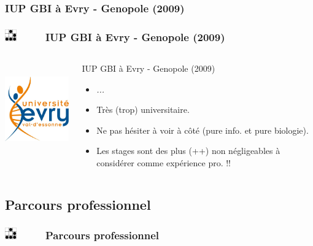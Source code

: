 \documentclass[slidetop,11pt]{beamer}
\def\sectionPartIIaTR{IUP GBI {\`a} Evry - Genopole (2009)} %
\def\sectionPartIIb{Parcours professionnel}
\def\moreInFrameTitle{\includegraphics[height=0.5cm]{img/logo_glider.png}~~~~~}
\begin{document}
\subsubsection{\sectionPartIIaTR}
\begin{frame}
	\frametitle{\moreInFrameTitle \sectionPartIIaTR}
	\begin{columns}[T]
	\begin{column}[T]{5cm}
		\includegraphics[height=4cm]{img/logo_ueve_2010.png}
	\end{column}
	\begin{column}[T]{7cm}
		\begin{beamerboxesrounded}	[lower=substructureTR, %
		 				 upper=block title TR,%
						 shadow=true]%
		       {\sectionPartIIaTR}
			\begin{itemize}
				\item \emph{...}
				\item Tr{\`e}s (trop) universitaire. 
				\item Ne pas h{\'e}siter {\`a} voir {\`a} c{\^o}t{\'e} (pure info. et pure biologie). 
				\item Les stages sont des plus (++) non n{\'e}gligeables {\`a} consid{\'e}rer comme exp{\'e}rience pro. !!
			\end{itemize}
		\end{beamerboxesrounded}
	\end{column}
	\end{columns}
\end{frame}

\subsection{\sectionPartIIb}
\begin{frame}
	\frametitle{\moreInFrameTitle \sectionPartIIb}
	\tableofcontents[sections=1,subsectionstyle=show/shaded/hide]
\end{frame}
\end{document}

